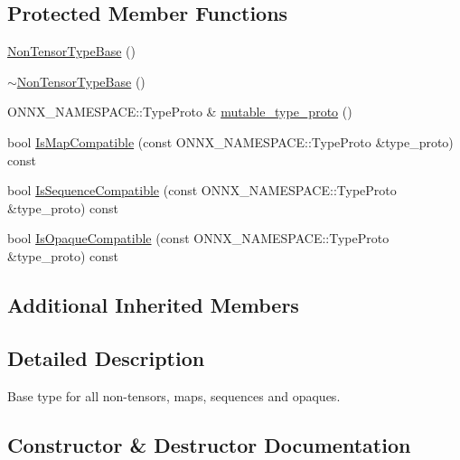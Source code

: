 \subsection*{Protected Member Functions}
\begin{DoxyCompactItemize}
\item 
\mbox{\hyperlink{classonnxruntime_1_1NonTensorTypeBase_ae529169eed1b9da39cde72c7178a9282}{Non\+Tensor\+Type\+Base}} ()
\item 
\mbox{\hyperlink{classonnxruntime_1_1NonTensorTypeBase_ae6204b8eea0363f0a607bd1cdbe01eaf}{$\sim$\+Non\+Tensor\+Type\+Base}} ()
\item 
O\+N\+N\+X\+\_\+\+N\+A\+M\+E\+S\+P\+A\+C\+E\+::\+Type\+Proto \& \mbox{\hyperlink{classonnxruntime_1_1NonTensorTypeBase_a1c22ddb6e8058d0cc4aa1d2b4be22f22}{mutable\+\_\+type\+\_\+proto}} ()
\item 
bool \mbox{\hyperlink{classonnxruntime_1_1NonTensorTypeBase_a1a6bfbb79b25f000e83106d79dd04c83}{Is\+Map\+Compatible}} (const O\+N\+N\+X\+\_\+\+N\+A\+M\+E\+S\+P\+A\+C\+E\+::\+Type\+Proto \&type\+\_\+proto) const
\item 
bool \mbox{\hyperlink{classonnxruntime_1_1NonTensorTypeBase_a51332c7112f44e9ba69c93c6ee0c222e}{Is\+Sequence\+Compatible}} (const O\+N\+N\+X\+\_\+\+N\+A\+M\+E\+S\+P\+A\+C\+E\+::\+Type\+Proto \&type\+\_\+proto) const
\item 
bool \mbox{\hyperlink{classonnxruntime_1_1NonTensorTypeBase_a70bd68569e639137686e8d8de0ec342d}{Is\+Opaque\+Compatible}} (const O\+N\+N\+X\+\_\+\+N\+A\+M\+E\+S\+P\+A\+C\+E\+::\+Type\+Proto \&type\+\_\+proto) const
\end{DoxyCompactItemize}
\subsection*{Additional Inherited Members}


\subsection{Detailed Description}
Base type for all non-\/tensors, maps, sequences and opaques. 

\subsection{Constructor \& Destructor Documentation}
\mbox{\label{classonnxruntime_1_1NonTensorTypeBase_a2066682e7223c4d4a80943d79bc3768c}} 
